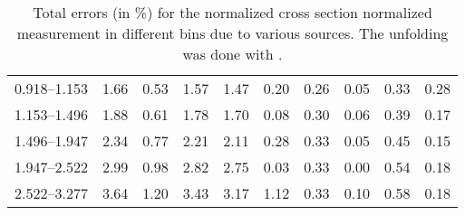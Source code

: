\begin{table}
\begin{center}
\begin{tabular}{@{}l l l l l l l l l l@{}}
            0.918--1.153     &  1.66   &  0.53   &  1.57         &  1.47      &  0.20    &  0.26  &  0.05       &  0.33  &  0.28  \\
            1.153--1.496     &  1.88   &  0.61   &  1.78         &  1.70      &  0.08    &  0.30  &  0.06       &  0.39  &  0.17  \\
            1.496--1.947     &  2.34   &  0.77   &  2.21         &  2.11      &  0.28    &  0.33  &  0.05       &  0.45  &  0.15  \\
            1.947--2.522     &  2.99   &  0.98   &  2.82         &  2.75      &  0.03    &  0.33  &  0.00       &  0.54  &  0.18  \\
            2.522--3.277     &  3.64   &  1.20   &  3.43         &  3.17      &  1.12    &  0.33  &  0.10       &  0.58  &  0.18  \\
            \bottomrule
        \end{tabular}
    \end{center}
    \caption[
        Total errors (in \%) for the normalized cross section normalized
        measurement with \POWHEG unfolding.
    ]{
        Total errors (in \%) for the normalized cross section normalized
        measurement in different \phistar bins due to various sources. The
        unfolding was done with \POWHEG.
    }
    \label{tab:sys_uncert_norm_powheg}
\end{table}

